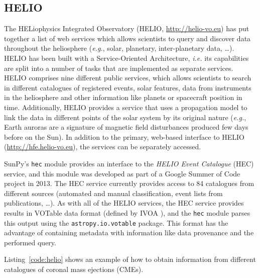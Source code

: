 \subsection{HELIO}\label{ssec:helio}

The HELiophysics Integrated Observatory 
(HELIO, \url{http://helio-vo.eu}) has put together a list of web 
services which allows scientists to query and discover data throughout 
the heliosphere (\textit{e.g.}, solar, planetary, inter-planetary data, 
\ldots)\citep{dps2012}.
HELIO has been built with a Service-Oriented Architecture, 
\textit{i.e.} its capabilities are split into a number of tasks that are 
implemented as separate services. 
HELIO comprises nine different public services, which allows scientists
to search in different catalogues of registered events, solar features,
data from instruments in the heliosphere and other information like planets or 
spacecraft position in time. 
Additionally, HELIO provides a service that uses a propagation model to link 
the data in different points of the solar system by its original nature 
(\textit{e.g.}, Earth auroras are a signature of magnetic field disturbances 
produced few days before on the Sun).
In addition to the primary, web-based interface to HELIO
(\url{http://hfe.helio-vo.eu}), the services can be separately accessed.

SunPy's \texttt{hec} module provides an interface to the
\textit{HELIO Event Catalogue} (HEC) service, and this module was developed as
part of a Google Summer of Code project in 2013.
The HEC service currently provides access to 84 catalogues from different
sources (automated and manual classification, event lists from publications, \ldots).
As with all of the HELIO services, the HEC service provides results in VOTable 
data format (defined by IVOA \cite{ochsenbein_ivoa_2011}), and the \texttt{hec}
module parses this output using the \texttt{astropy.io.votable} package.
This format has the advantage of containing metadata with information like
data provenance and the performed query.

Listing~\ref{code:helio} shows an example of how to obtain information
from different catalogues of coronal mass ejections (CMEs).

